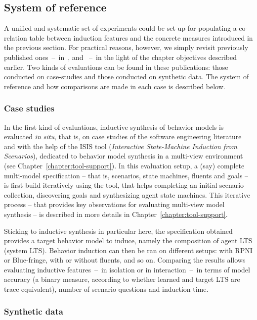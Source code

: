 \subsection{System of reference}

A unified and systematic set of experiments could be set up for populating a co-relation table between induction features and the concrete measures introduced in the previous section. For practical reasons, however, we simply revisit previously published ones~--~in~\cite{Damas:2006}, \cite{Dupont:2008} and \cite{Lambeau:2008}~--~in the light of the chapter objectives described earlier. Two kinds of evaluations can be found in these publications: those conducted on case-studies and those conducted on synthetic data. The system of reference and how comparisons are made in each case is described below.

\subsubsection*{Case studies}

In the first kind of evaluations, inductive synthesis of behavior models is evaluated \emph{in situ}, that is, on case studies of the software engineering literature and with the help of the ISIS tool (\emph{Interactive State-Machine Induction from Scenarios}), dedicated to behavior model synthesis in a multi-view environment (see Chapter~\ref{chapter:tool-support}). In this evaluation setup, a (say) complete multi-model specification -- that is, scenarios, state machines, fluents and goals -- is first build iteratively using the tool, that helps completing an initial scenario collection, discovering goals and synthesizing agent state machines. This iterative process -- that provides key observations for evaluating multi-view model synthesis -- is described in more details in Chapter~\ref{chapter:tool-support}. 

Sticking to inductive synthesis in particular here, the specification obtained provides a target behavior model to induce, namely the composition of agent LTS (system LTS).  Behavior induction can then be ran on different setups: with RPNI or Blue-fringe, with or without fluents, and so on. Comparing the results allows evaluating inductive features~--~in isolation or in interaction~--~in terms of model accuracy (a binary measure, according to whether learned and target LTS are trace equivalent), number of scenario questions and induction time.

\subsubsection*{Synthetic data}

